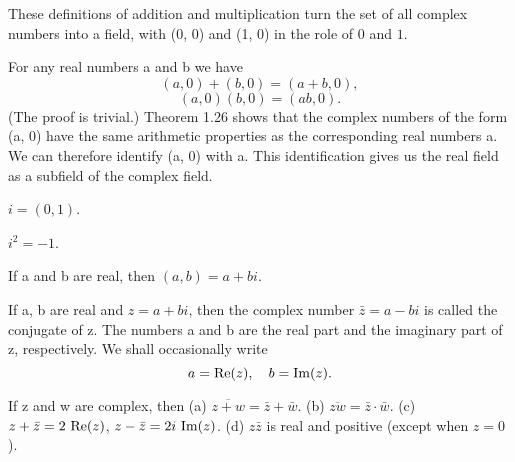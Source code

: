 \begin{theorem} %
  \label{thm:chap1:complex_field}
  These definitions of addition and multiplication turn the set of
  all complex numbers into a field, with (0, 0) and (1, 0) in the
  role of $0$ and $1$.
\end{theorem}

\begin{theorem} %
  \label{thm:chap1:real_subfield_of_complex}
  For any real numbers a and b we have
  \[ (a, 0) + (b, 0) = (a+b, 0), \]
  \[ (a, 0)(b, 0) = (ab, 0). \]
  (The proof is trivial.)
  Theorem 1.26 shows that the complex numbers of the form (a, 0) have
  the same arithmetic properties as the corresponding real numbers a.
  We can therefore identify (a, 0) with a. This identification gives
  us the real field as a subfield of the complex field.
\end{theorem}

\begin{definition}[Definition of i] %
  \label{def:chap1:i_definition}
  $i = (0, 1)$.
\end{definition}

\begin{theorem}[i squared] %
  \label{thm:chap1:i_squared}
  $i^2 = -1$.
\end{theorem}

\begin{theorem}[a+bi form] %
  \label{thm:chap1:a_plus_bi_form}
  If a and b are real, then $(a, b) = a+bi$.
\end{theorem}

\begin{definition} %
  \label{def:chap1:conjugate_real_imaginary}
  If a, b are real and $z=a+bi$, then the complex number $\bar{z} =
  a-bi$ is called the conjugate of z. The numbers a and b are the
  real part and the imaginary part of z, respectively.
  We shall occasionally write
  \[ a = \operatorname{Re}(z), \quad b = \operatorname{Im}(z). \]
\end{definition}

\begin{theorem} %
  \label{thm:chap1:conjugate_properties}
  If z and w are complex, then
  (a) $\overline{z+w} = \bar{z} + \bar{w}$.
  (b) $\overline{zw} = \bar{z} \cdot \bar{w}$.
  (c) $z + \bar{z} = 2 \, \operatorname{Re}(z)$, $z - \bar{z} = 2i \, \operatorname{Im}(z)$.
  (d) $z\bar{z}$ is real and positive (except when $z=0$).
\end{theorem}

